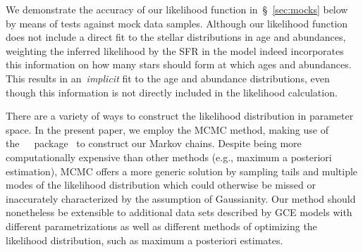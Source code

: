 \documentclass[ms.tex]{subfiles}
\begin{document}
\par
We demonstrate the accuracy of our likelihood function in~\S~\ref{sec:mocks}
below by means of tests against mock data samples.
Although our likelihood function does not include a direct fit to the
stellar distributions in age and abundances, weighting the inferred likelihood
by the SFR in the model indeed incorporates this information on how many stars
should form at which ages and abundances.
This results in an~\textit{implicit} fit to the age and abundance distributions,
even though this information is not directly included in the likelihood
calculation.
\par
There are a variety of ways to construct the likelihood distribution in
parameter space.
In the present paper, we employ the MCMC method, making use of
the~\mc~\python~package~\citep{ForemanMackey2013} to construct our Markov
chains.
Despite being more computationally expensive than other methods (e.g.,
maximum a posteriori estimation), MCMC offers a more generic solution by
sampling tails and multiple modes of the likelihood distribution which could
otherwise be missed or inaccurately characterized by the assumption of
Gaussianity.
Our method should nonetheless be extensible to additional data sets described
by GCE models with different parametrizations as well as different methods of
optimizing the likelihood distribution, such as maximum a posteriori estimates.
\end{document}
